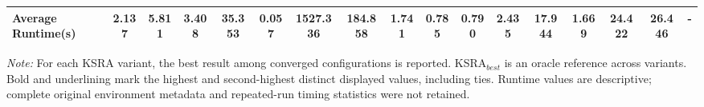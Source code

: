 \documentclass[ASNA,twocolumn]{USG} %
\begin{document}
\begin{table}[!ht]
{\begin{tabular}{lccccccccccc|cccc|c}
            Average Runtime(s) & 2.137 & 5.811 & 3.408 & 35.353 & 0.057 & 1527.336 & 184.858 & 1.741 & 0.785 & 0.790 & 2.435 & 17.944 & 1.669 & 24.422 & 26.446 & - \\
            \bottomrule
        \end{tabular}%
    }
    \par\vspace{2pt}
    \parbox{\textwidth}{\footnotesize\textit{Note:} For each KSRA variant, the best result among converged configurations is reported. KSRA$_{best}$ is an oracle reference across variants. Bold and underlining mark the highest and second-highest distinct displayed values, including ties. Runtime values are descriptive; complete original environment metadata and repeated-run timing statistics were not retained.}
\end{table}
\end{document}
